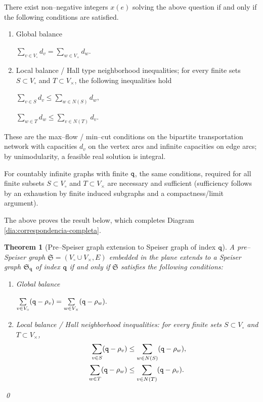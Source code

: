 \documentclass[final,3p,times]{elsarticle}
\newtheorem{theorem}{Theorem}[section]
\theoremstyle{definition}
\begin{document}
There exist non--negative integers $x(e)$ solving the above question if and only if 
the following conditions are satisfied.
\begin{enumerate}[label=\arabic*),leftmargin=*]	
\item 
Global balance   

\centerline{$
\sum\limits_{v\in V_\circ } d_v = \sum\limits_{w\in V_\times } d_w .
$} 

\item 
Local balance / Hall type neighborhood inequalities;
for every finite sets $S\subset V_\circ$ and $T\subset V_\times$, the following inequalities hold

\centerline{$
\sum\limits_{v\in S } d_v \leq \sum\limits_{w\in N(S) } d_w ,
$} 
 
\centerline{$
\sum\limits_{w\in T } d_w \leq \sum\limits_{v\in N(T) } d_v .
$} 
\end{enumerate}
These are the max--flow / min--cut conditions on the bipartite transportation network with
capacities $d_v$ on the vertex arcs and infinite capacities on edge arcs; 
by unimodularity, a feasible real solution is integral.

For countably infinite graphs with finite $\tt q$, the same conditions, required for all 
finite subsets $S\subset V_\circ$ and $T\subset V_\times$ are necessary and sufficient
(sufficiency follows by an exhaustion by finite induced subgraphs and a compactness/limit
argument).

The above proves the result below, which completes
Diagram \ref{dia:correspondencia-completa}.



\begin{theorem}[Pre--Speiser graph extension to Speiser graph of index $\tt q$]
\label{prop:balance-conditions-Speiser-graphs}
A pre--Speiser graph
$\mathfrak{S}=(V_\circ \cup V_\times, E)$ embedded in the 
plane
extends to a Speiser graph $\mathfrak{S}_{\tt q}$ of index $\tt q$ 
if and only if 
$\mathfrak{S}$ satisfies the following conditions:

\begin{enumerate}[label=\arabic*),leftmargin=*]	
\item 
Global balance

\centerline{$
\sum\limits_{v\in V_\circ} ({\tt q} - \rho_v) = \sum\limits_{w\in V_\times} ({\tt q} - \rho_w) .
$} 

\item Local balance / Hall neighborhood inequalities:
for every finite sets $S\subset V_\circ$ and $T\subset V_\times$, 
\begin{eqnarray}
\label{eq:Hall-S}
\sum\limits_{v\in S} ({\tt q} - \rho_v) &\leq \sum\limits_{w\in N(S)} ({\tt q} - \rho_w) ,
\\
\label{eq:Hall-T}
\sum\limits_{w\in T} ({\tt q} - \rho_w) &\leq \sum\limits_{v\in N(T)} ({\tt q} - \rho_v) .
\end{eqnarray}

\end{enumerate}


\hfill\qed
\end{theorem}
\end{document}
